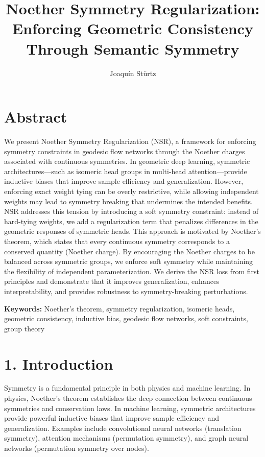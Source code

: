 \documentclass[12pt]{article}
\title{\textbf{Noether Symmetry Regularization: Enforcing Geometric Consistency Through Semantic Symmetry}}
\author{Joaquín Stürtz}
\date{}
\begin{document}
\maketitle

\section*{Abstract}

We present Noether Symmetry Regularization (NSR), a framework for enforcing symmetry constraints in geodesic flow networks through the Noether charges associated with continuous symmetries. In geometric deep learning, symmetric architectures—such as isomeric head groups in multi-head attention—provide inductive biases that improve sample efficiency and generalization. However, enforcing exact weight tying can be overly restrictive, while allowing independent weights may lead to symmetry breaking that undermines the intended benefits. NSR addresses this tension by introducing a soft symmetry constraint: instead of hard-tying weights, we add a regularization term that penalizes differences in the geometric responses of symmetric heads. This approach is motivated by Noether's theorem, which states that every continuous symmetry corresponds to a conserved quantity (Noether charge). By encouraging the Noether charges to be balanced across symmetric groups, we enforce soft symmetry while maintaining the flexibility of independent parameterization. We derive the NSR loss from first principles and demonstrate that it improves generalization, enhances interpretability, and provides robustness to symmetry-breaking perturbations.

\textbf{Keywords:} Noether's theorem, symmetry regularization, isomeric heads, geometric consistency, inductive bias, geodesic flow networks, soft constraints, group theory

\section{1. Introduction}

Symmetry is a fundamental principle in both physics and machine learning. In physics, Noether's theorem establishes the deep connection between continuous symmetries and conservation laws. In machine learning, symmetric architectures provide powerful inductive biases that improve sample efficiency and generalization. Examples include convolutional neural networks (translation symmetry), attention mechanisms (permutation symmetry), and graph neural networks (permutation symmetry over nodes).
\end{document}
